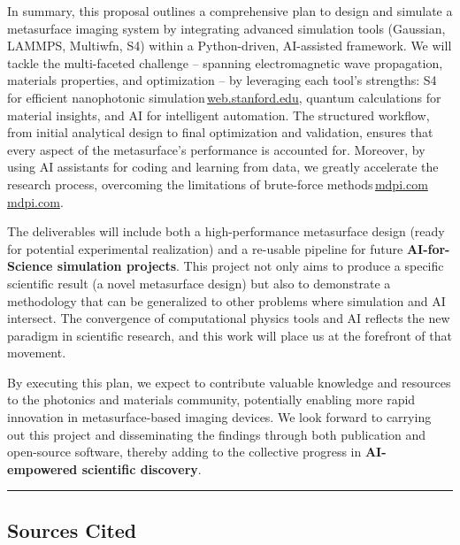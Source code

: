 \documentclass[11pt]{article}
\begin{document}
In summary, this proposal outlines a comprehensive plan to design and simulate a metasurface imaging system by integrating advanced simulation tools (Gaussian, LAMMPS, Multiwfn, S4) within a Python-driven, AI-assisted framework. We will tackle the multi-faceted challenge -- spanning electromagnetic wave propagation, materials properties, and optimization -- by leveraging each tool's strengths: S4 for efficient nanophotonic simulation\,\href{https://web.stanford.edu/group/fan/S4/#:~:text=What%20can%20it%20compute%3F%E2%80%B6}{web.stanford.edu}, quantum calculations for material insights, and AI for intelligent automation. The structured workflow, from initial analytical design to final optimization and validation, ensures that every aspect of the metasurface's performance is accounted for. Moreover, by using AI assistants for coding and learning from data, we greatly accelerate the research process, overcoming the limitations of brute-force methods\,\href{https://www.mdpi.com/2304-6732/12/10/947#:~:text=Traditional%20metasurface%20design%20methods%20mainly,simulate%20and%20analyze%20the%20electromagnetic}{mdpi.com}\,\href{https://www.mdpi.com/2304-6732/12/10/947#:~:text=approach%20is%20computationally%20intensive%20and,Overall%2C%20traditional%20methods%20can%20partially}{mdpi.com}.

The deliverables will include both a high-performance metasurface design (ready for potential experimental realization) and a re-usable pipeline for future \textbf{AI-for-Science simulation projects}. This project not only aims to produce a specific scientific result (a novel metasurface design) but also to demonstrate a methodology that can be generalized to other problems where simulation and AI intersect. The convergence of computational physics tools and AI reflects the new paradigm in scientific research, and this work will place us at the forefront of that movement.

By executing this plan, we expect to contribute valuable knowledge and resources to the photonics and materials community, potentially enabling more rapid innovation in metasurface-based imaging devices. We look forward to carrying out this project and disseminating the findings through both publication and open-source software, thereby adding to the collective progress in \textbf{AI-empowered scientific discovery}.

\bigskip
\noindent\rule{\linewidth}{0.4pt}

\subsection*{Sources Cited}
\end{document}
